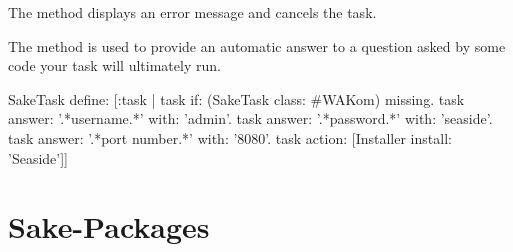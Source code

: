 \documentclass[a4paper,10pt,twoside]{book}
\begin{document}
The method  displays an error message and cancels the task.

The method  is used to provide an automatic answer to a question asked by some code your task will ultimately run.

\begin{code}{}
SakeTask define: [:task |
  task if: (SakeTask class: #WAKom) missing.
  task answer: '.*username.*' with: 'admin'.
  task answer: '.*password.*' with: 'seaside'.
  task answer: '.*port number.*' with: '8080'.
  task action: [Installer install: 'Seaside']]
\end{code}

\section{Sake-Packages}
\label{sec:sake-packages}



\ifx\wholebook\relax\else
   
   
\end{document}
